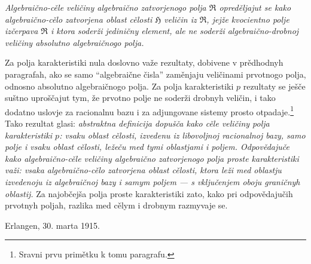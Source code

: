 \documentclass[11pt]{article}
\begin{document}
{\itshape Algebraično-cěle veličiny algebraično zatvorjenogo polja
$\mathfrak R$ opreděljajut se kako algebraično-cělo zatvorjena oblast cělosti
$\mathfrak H$ veličin iz $\mathfrak R$, jejže kvocientno polje izčerpava
$\mathfrak R$ i ktora soderži jediničny element, ale ne soderži
algebraično-drobnoj veličiny absolutno algebraičnogo polja.}

Za polja karakteristiki nula doslovno važe rezultaty, dobivene v prědhodnyh
paragrafah, ako se samo ``algebraične čisla'' zaměnjaju veličinami prvotnogo
polja, odnosno absolutno algebraičnogo polja. Za polja karakteristiki $p$
rezultaty se ješče suštno uproščajut tym, že prvotno polje ne soderži drobnyh
veličin, i tako dodatno uslovje za racionalnu bazu i za adjungovane sistemy
prosto otpadaje.\footnote{Sravni prvu primětku k tomu paragrafu.} Tako rezultat
glasi: {\itshape abstraktna definicija dopušča kako cěle veličiny polja
karakteristiki $p$: vsaku oblast cělosti, izvedenu iz libovoljnoj racionalnoj
bazy, samo polje i vsaku oblast cělosti, ležeču med tymi oblastjami i poljem.
Odpovědajuče kako algebraično-cěle veličiny algebraično zatvorjenogo polja proste
karakteristiki važi: vsaka algebraično-cělo zatvorjena oblast cělosti, ktora
leži med oblastju izvedenoju iz algebraičnoj bazy i samym poljem --- s
vključenjem oboju graničnyh oblastij.} Za najobčejša polja proste
karakteristiki zato, kako pri odpovědajučih prvotnyh poljah, razlika med cělym i
drobnym razmyvaje se.

\medskip
\noindent Erlangen, 30. marta 1915.

\clearpage
\end{document}
